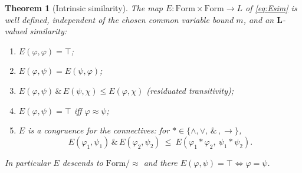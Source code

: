 \documentclass{amsart}
\theoremstyle{definition}
\theoremstyle{plain}
\newtheorem{theorem}{Theorem}
\newcommand{\bL}{\mathbf{L}}
\newcommand{\Form}{\mathrm{Form}}
\newcommand{\fto}{\rightarrow}
\newcommand{\odotop}{\,\&\,}
\newcommand{\Top}{\top}
\begin{document}
\begin{theorem}[Intrinsic similarity]\label{thm:intrinsic}
The map $E:\Form\times\Form\to L$ of \eqref{eq:Esim} is well defined,
independent of the chosen common variable bound $m$, and an $\bL$-valued
similarity:
\begin{enumerate}
\item\label{it:E-refl} $E(\varphi,\varphi)=\Top$;
\item\label{it:E-sym} $E(\varphi,\psi)=E(\psi,\varphi)$;
\item\label{it:E-trans} $E(\varphi,\psi)\odotop E(\psi,\chi)\le E(\varphi,\chi)$
(residuated transitivity);
\item\label{it:E-sep} $E(\varphi,\psi)=\Top$ iff $\varphi\approx\psi$;
\item\label{it:E-cong} $E$ is a congruence for the connectives: for
$*\in\{\wedge,\vee,\odotop,\fto\}$,
\[
E(\varphi_1,\psi_1)\odotop E(\varphi_2,\psi_2)\ \le\
E(\varphi_1*\varphi_2,\ \psi_1*\psi_2).
\]
\end{enumerate}
In particular $E$ descends to $\Form/{\approx}$ and there
$E(\varphi,\psi)=\Top\iff\varphi=\psi$.
\end{theorem}
\end{document}
